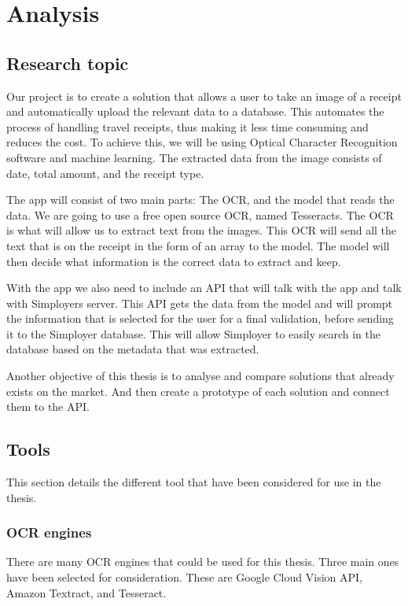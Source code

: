\cleardoublepage
\chapter{Analysis}
\label{ch:analysis}

\section{Research topic}\label{sec:research-topic}

Our project is to create a solution that allows a user to take an image of a receipt and automatically upload the relevant data to a database.
This automates the process of handling travel receipts, thus making it less time consuming and reduces the cost.
To achieve this, we will be using Optical Character Recognition software and machine learning\@.
The extracted data from the image consists of date, total amount, and the receipt type.

The app will consist of two main parts: The OCR, and the model that reads the data.
We are going to use a free open source OCR, named Tesseracts.
The OCR is what will allow us to extract text from the images.
This OCR will send all the text that is on the receipt in the form of an array to the model.
The model will then decide what information is the correct data to extract and keep.

With the app we also need to include an API that will talk with the app and talk with Simployers server.
This API gets the data from the model and will prompt the information that is selected for the user for a final
validation, before sending it to the Simployer database.
This will allow Simployer to easily search in the database based on the metadata that was extracted.

Another objective of this thesis is to analyse and compare solutions that already exists on the market.
And then create a prototype of each solution and connect them to the API\@.

\section{Tools}\label{sec:tools}
This section details the different tool that have been considered for use in the thesis.
\subsection{OCR engines}\label{subsec:ocr-engines}
There are many OCR engines that could be used for this thesis.
Three main ones have been selected for consideration.
These are Google Cloud Vision API, Amazon Textract, and Tesseract.
